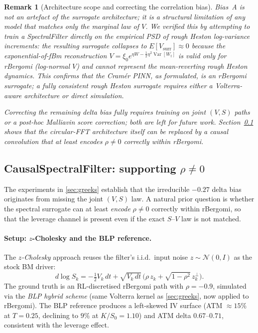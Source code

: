 \documentclass[11pt,a4paper]{article}
\newtheorem{remark}[theorem]{Remark}
\begin{document}
\begin{remark}[Architecture scope and correcting the correlation bias]
\label{rem:rho}
 Bias~A is not an artefact of the surrogate architecture; it is a
 structural limitation of any model that matches only the marginal law
 of $V$. We verified this by attempting to train a SpectralFilter
 directly on the empirical PSD of rough Heston log-variance increments:
 the resulting surrogate collapses to $E[V_\text{surr}] \approx 0$
 because the exponential-of-fBm reconstruction
 $V = \xi_0 e^{\eta W - \frac{1}{2}\eta^2 \operatorname{Var}[W_t]}$
 is valid only for rBergomi (log-normal $V$) and cannot represent the
 mean-reverting rough Heston dynamics. This confirms that the Cramér
 PINN, as formulated, is an rBergomi surrogate; a fully consistent rough
 Heston surrogate requires either a Volterra-aware architecture or
 direct simulation.

 Correcting the remaining delta bias fully requires training on joint
 $(V, S)$ paths or a post-hoc Malliavin score correction; both are left
 for future work. Section~\ref{sec:causal} shows that the circular-FFT
 architecture itself can be replaced by a causal convolution that at
 least encodes $\rho \neq 0$ correctly within rBergomi.
\end{remark}

\subsection{CausalSpectralFilter: supporting $\rho \neq 0$}
\label{sec:causal}

The experiments in \cref{sec:greeks} establish that the irreducible
$-0.27$ delta bias originates from missing the joint $(V,S)$ law. A
natural prior question is whether the spectral surrogate can at least
\emph{encode} $\rho \neq 0$ correctly within rBergomi, so that the
leverage channel is present even if the exact $S$--$V$ law is not matched.

\paragraph{Setup: $z$-Cholesky and the BLP reference.}
The \emph{$z$-Cholesky} approach reuses the filter's i.i.d.\ input noise
$z \sim \mathcal{N}(0,I)$ as the stock BM driver:
\begin{equation}
 d\!\log S_k
  = -\tfrac{1}{2}V_k\,dt
   + \sqrt{V_k\,dt}\,\bigl(\rho\,z_k + \sqrt{1-\rho^2}\,z_k^\perp\bigr).
 \label{eq:z-cholesky}
\end{equation}
The ground truth is an RL-discretised rBergomi path with $\rho = -0.9$,
simulated via the \emph{BLP hybrid scheme} \citep{bennedsen2017hybrid}
(same Volterra kernel as \cref{sec:greeks}, now applied to rBergomi).
The BLP reference produces a left-skewed IV surface (ATM $\approx 15\%$
at $T=0.25$, declining to $9\%$ at $K/S_0 = 1.10$) and ATM delta
$0.67$--$0.71$, consistent with the leverage effect.
\end{document}
